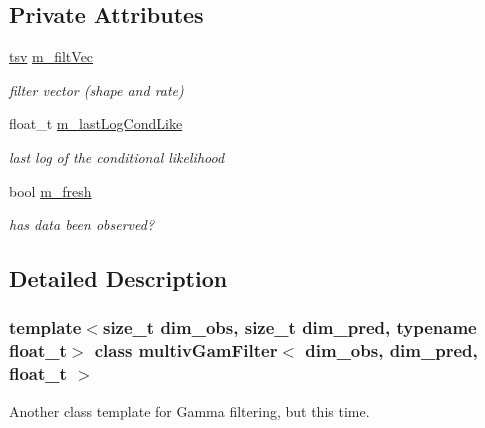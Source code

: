 \subsection*{Private Attributes}
\begin{DoxyCompactItemize}
\item 
\mbox{\label{classmultivGamFilter_a5a0acb67db0bbd0c687c59e3ec05a123}} 
\hyperlink{classmultivGamFilter_a312ca8e7f1344cdeb01fe9e01850aa8e}{tsv} \hyperlink{classmultivGamFilter_a5a0acb67db0bbd0c687c59e3ec05a123}{m\+\_\+filt\+Vec}
\begin{DoxyCompactList}\small\item\em filter vector (shape and rate) \end{DoxyCompactList}\item 
\mbox{\label{classmultivGamFilter_a0c98ad325dec2868dcc0307f8f438f85}} 
float\+\_\+t \hyperlink{classmultivGamFilter_a0c98ad325dec2868dcc0307f8f438f85}{m\+\_\+last\+Log\+Cond\+Like}
\begin{DoxyCompactList}\small\item\em last log of the conditional likelihood \end{DoxyCompactList}\item 
\mbox{\label{classmultivGamFilter_a8ac99863dd918c7fcb6c97a7722efa2b}} 
bool \hyperlink{classmultivGamFilter_a8ac99863dd918c7fcb6c97a7722efa2b}{m\+\_\+fresh}
\begin{DoxyCompactList}\small\item\em has data been observed? \end{DoxyCompactList}\end{DoxyCompactItemize}


\subsection{Detailed Description}
\subsubsection*{template$<$size\+\_\+t dim\+\_\+obs, size\+\_\+t dim\+\_\+pred, typename float\+\_\+t$>$\newline
class multiv\+Gam\+Filter$<$ dim\+\_\+obs, dim\+\_\+pred, float\+\_\+t $>$}

Another class template for Gamma filtering, but this time. 

